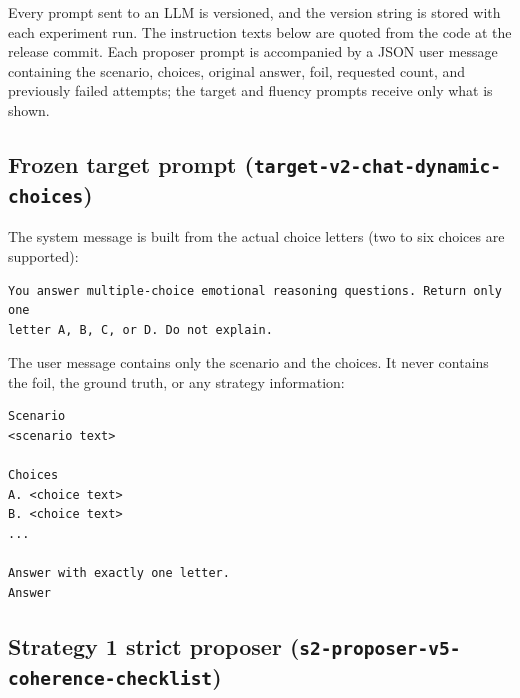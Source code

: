 \documentclass[11pt,a4paper]{article}
\begin{document}
Every prompt sent to an LLM is versioned, and the version string is stored with each
experiment run. The instruction texts below are quoted from the code at the release
commit. Each proposer prompt is accompanied by a JSON user message containing the
scenario, choices, original answer, foil, requested count, and previously failed
attempts; the target and fluency prompts receive only what is shown.

\subsection{Frozen target prompt (\texttt{target-v2-chat-dynamic-choices})}

The system message is built from the actual choice letters (two to six choices are
supported):

\begin{lstlisting}[style=prompt]
You answer multiple-choice emotional reasoning questions. Return only one
letter A, B, C, or D. Do not explain.
\end{lstlisting}

The user message contains only the scenario and the choices. It never contains the
foil, the ground truth, or any strategy information:

\begin{lstlisting}[style=prompt]
Scenario
<scenario text>

Choices
A. <choice text>
B. <choice text>
...

Answer with exactly one letter.
Answer
\end{lstlisting}

\subsection{Strategy 1 strict proposer (\texttt{s2-proposer-v5-\allowbreak coherence-\allowbreak checklist})}
\end{document}
